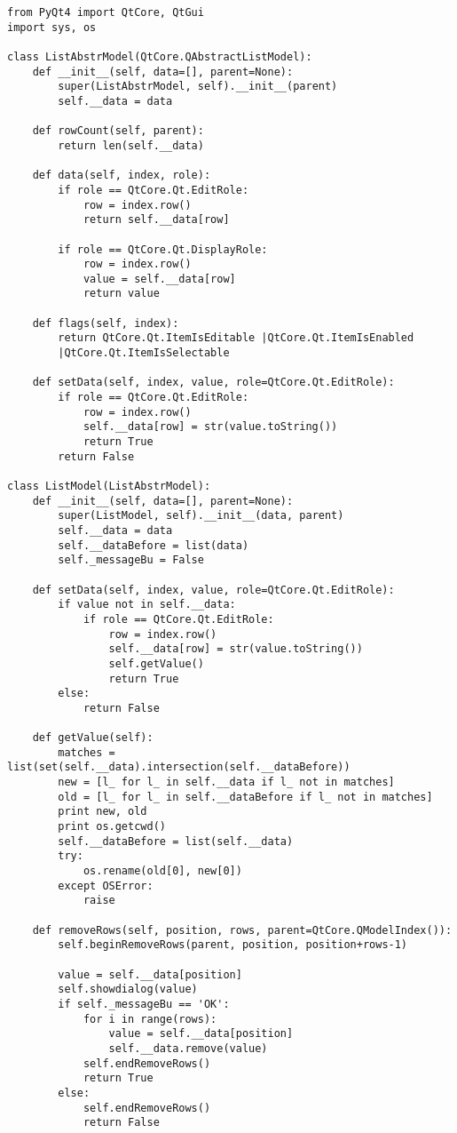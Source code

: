 \begin{verbatim}
from PyQt4 import QtCore, QtGui
import sys, os

class ListAbstrModel(QtCore.QAbstractListModel): 
    def __init__(self, data=[], parent=None):
        super(ListAbstrModel, self).__init__(parent)
        self.__data = data

    def rowCount(self, parent):
        return len(self.__data)

    def data(self, index, role):
        if role == QtCore.Qt.EditRole:
            row = index.row()
            return self.__data[row]

        if role == QtCore.Qt.DisplayRole:
            row = index.row()
            value = self.__data[row]
            return value

    def flags(self, index):
        return QtCore.Qt.ItemIsEditable |QtCore.Qt.ItemIsEnabled 
        |QtCore.Qt.ItemIsSelectable

    def setData(self, index, value, role=QtCore.Qt.EditRole):
        if role == QtCore.Qt.EditRole:
            row = index.row()
            self.__data[row] = str(value.toString())
            return True
        return False

class ListModel(ListAbstrModel):
    def __init__(self, data=[], parent=None):
        super(ListModel, self).__init__(data, parent)
        self.__data = data
        self.__dataBefore = list(data)
        self._messageBu = False

    def setData(self, index, value, role=QtCore.Qt.EditRole):
        if value not in self.__data:
            if role == QtCore.Qt.EditRole:
                row = index.row()
                self.__data[row] = str(value.toString())
                self.getValue()
                return True
        else:
            return False

    def getValue(self):
        matches = list(set(self.__data).intersection(self.__dataBefore))
        new = [l_ for l_ in self.__data if l_ not in matches]
        old = [l_ for l_ in self.__dataBefore if l_ not in matches]
        print new, old
        print os.getcwd()
        self.__dataBefore = list(self.__data)
        try:
            os.rename(old[0], new[0])
        except OSError:
            raise

    def removeRows(self, position, rows, parent=QtCore.QModelIndex()):
        self.beginRemoveRows(parent, position, position+rows-1)

        value = self.__data[position]
        self.showdialog(value)
        if self._messageBu == 'OK':
            for i in range(rows):    
                value = self.__data[position]   
                self.__data.remove(value)
            self.endRemoveRows()
            return True
        else:
            self.endRemoveRows()
            return False
            

\end{verbatim}
